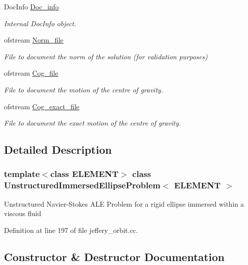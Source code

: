 \begin{DoxyCompactItemize}
Doc\+Info \hyperlink{classUnstructuredImmersedEllipseProblem_a1c463ed904f01e6466baae0533c79780}{Doc\+\_\+info}
\begin{DoxyCompactList}\small\item\em Internal Doc\+Info object. \end{DoxyCompactList}\item 
ofstream \hyperlink{classUnstructuredImmersedEllipseProblem_a71a3b24b610e05f7be916c4214dab8dc}{Norm\+\_\+file}
\begin{DoxyCompactList}\small\item\em File to document the norm of the solution (for validation purposes) \end{DoxyCompactList}\item 
ofstream \hyperlink{classUnstructuredImmersedEllipseProblem_acd1e8ec8e510f029f449f13dfdebbc99}{Cog\+\_\+file}
\begin{DoxyCompactList}\small\item\em File to document the motion of the centre of gravity. \end{DoxyCompactList}\item 
ofstream \hyperlink{classUnstructuredImmersedEllipseProblem_a3dc1ec2e066466a6f228864b873d95fa}{Cog\+\_\+exact\+\_\+file}
\begin{DoxyCompactList}\small\item\em File to document the exact motion of the centre of gravity. \end{DoxyCompactList}\end{DoxyCompactItemize}


\subsection{Detailed Description}
\subsubsection*{template$<$class E\+L\+E\+M\+E\+NT$>$\newline
class Unstructured\+Immersed\+Ellipse\+Problem$<$ E\+L\+E\+M\+E\+N\+T $>$}

Unstructured Navier-\/\+Stokes A\+LE Problem for a rigid ellipse immersed within a viscous fluid 

Definition at line 197 of file jeffery\+\_\+orbit.\+cc.



\subsection{Constructor \& Destructor Documentation}
\mbox{\label{classUnstructuredImmersedEllipseProblem_a544a35f261200bb4a4e29a88faa1a69c}} 
